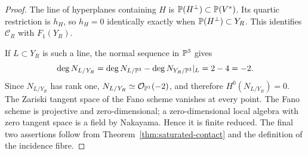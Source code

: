 \begin{proof}
The line of hyperplanes containing \(H\) is
\(\mathbb P(H^\perp)\subset\mathbb P(V^*)\).  Its quartic restriction is
\(h_H\), so \(h_H=0\) identically exactly when
\(\mathbb P(H^\perp)\subset Y_R\).  This identifies \(\mathcal C_R\) with
\(F_1(Y_R)\).

If \(L\subset Y_R\) is such a line, the normal sequence in
\(\mathbb P^3\) gives
\[
 \deg N_{L/Y_R}
 =
 \deg N_{L/\mathbb P^3}-\deg N_{Y_R/\mathbb P^3}|_L
 =2-4=-2.
\]
Since \(N_{L/Y_R}\) has rank one,
\(N_{L/Y_R}\simeq\mathcal O_{\mathbb P^1}(-2)\), and therefore
\(H^0(N_{L/Y_R})=0\).  The Zariski tangent space of the Fano scheme
vanishes at every point.  The Fano scheme is projective and
zero-dimensional; a zero-dimensional local algebra with zero tangent
space is a field by Nakayama.  Hence it is finite reduced.  The final
two assertions follow from Theorem~\ref{thm:saturated-contact} and
the definition of the incidence fibre.
\end{proof}
